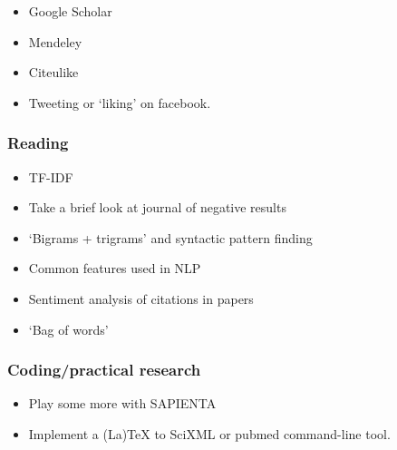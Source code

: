 \begin{itemize}
\item
  Google Scholar
\item
  Mendeley
\item
  Citeulike
\item
  Tweeting or `liking' on facebook.
\end{itemize}

\subsubsection{Reading}

\begin{itemize}
\item
  TF-IDF
\item
  Take a brief look at journal of negative results
\item
  `Bigrams + trigrams' and syntactic pattern finding
\item
  Common features used in NLP
\item
  Sentiment analysis of citations in papers
\item
  `Bag of words'
\end{itemize}

\subsubsection{Coding/practical research}

\begin{itemize}
\item
  Play some more with SAPIENTA
\item
  Implement a (La)TeX to SciXML or pubmed command-line tool.
\end{itemize}
